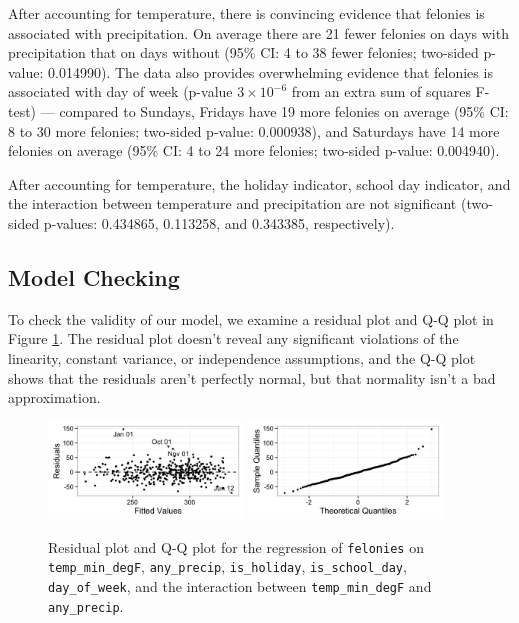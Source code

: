 \documentclass[11pt,notitlepage]{article}
\begin{document}

After accounting for temperature, there is convincing evidence that felonies is associated with precipitation. On average there are 21 fewer felonies on days with precipitation that on days without (95\% CI: 4 to 38 fewer felonies; two-sided p-value: 0.014990). The data also provides overwhelming evidence that felonies is associated with day of week (p-value $3 \times 10^{-6}$ from an extra sum of squares F-test) --- compared to Sundays, Fridays have 19 more felonies on average (95\% CI: 8 to 30 more felonies; two-sided p-value: 0.000938), and Saturdays have 14 more felonies on average (95\% CI: 4 to 24 more felonies; two-sided p-value: 0.004940).

After accounting for temperature, the holiday indicator, school day indicator, and the interaction between temperature and precipitation are not significant (two-sided p-values: 0.434865, 0.113258, and 0.343385, respectively).

\subsection{Model Checking}

To check the validity of our model, we examine a residual plot and Q-Q plot in Figure \ref{fig:lm4ResidualsQQ}. The residual plot doesn't reveal any significant violations of the linearity, constant variance, or independence assumptions, and the Q-Q plot shows that the residuals aren't perfectly normal, but that normality isn't a bad approximation.

\begin{figure}[!h]
  \centering
  \captionsetup{width=0.8\textwidth}
  \subfloat%
  		{\includegraphics[width=0.46\textwidth]
  		{figures/lm4Residuals.png}\label{fig:lm4Residuals}}
  \hfill
  \subfloat%
  		{\includegraphics[width=0.46\textwidth]
  		{figures/lm4QQ.png}\label{fig:lm4QQ}}
  \caption{Residual plot and Q-Q plot for the regression of \texttt{felonies} on \texttt{temp_min_degF}, \texttt{any_precip}, \texttt{is_holiday}, \texttt{is_school_day}, \texttt{day_of_week}, and the interaction between \texttt{temp_min_degF} and \texttt{any_precip}.}
  \label{fig:lm4ResidualsQQ}
\end{figure}
\end{document}
